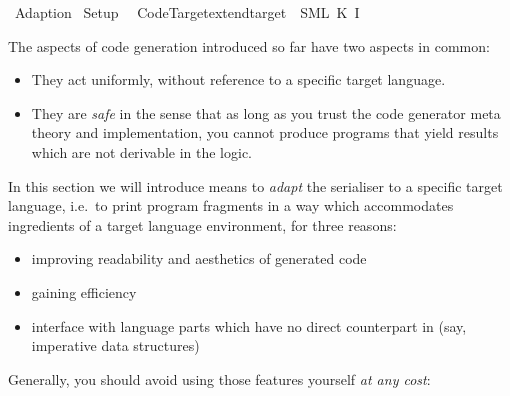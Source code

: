 %
\begin{isabellebody}%
\def\isabellecontext{Adaption}%
%
\isadelimtheory
%
\endisadelimtheory
%
\isatagtheory
{}\isamarkupfalse%
\ Adaption\isanewline
{}\ Setup\isanewline
{}%
\endisatagtheory
{\isafoldtheory}%
%
\isadelimtheory
\isanewline
%
\endisadelimtheory
%
\isadeliminvisible
\isanewline
%
\endisadeliminvisible
%
\isataginvisible
{}\isamarkupfalse%
\ {\isacharverbatimopen}\ Code{\isacharunderscore}Target{\isachardot}extend{\isacharunderscore}target\ {\isacharparenleft}{\isachardoublequote}{\isasymSML}{\isachardoublequote}{\isacharcomma}\ {\isacharparenleft}{\isachardoublequote}SML{\isachardoublequote}{\isacharcomma}\ K\ I{\isacharparenright}{\isacharparenright}\ {\isacharverbatimclose}%
\endisataginvisible
{\isafoldinvisible}%
%
\isadeliminvisible
%
\endisadeliminvisible
%
\isamarkuptrue%
%
\isamarkuptrue%
%
\begin{isamarkuptext}%
The aspects of code generation introduced so far have two aspects
  in common:

  \begin{itemize}
    \item They act uniformly, without reference to a specific
       target language.
    \item They are \emph{safe} in the sense that as long as you trust
       the code generator meta theory and implementation, you cannot
       produce programs that yield results which are not derivable
       in the logic.
  \end{itemize}

  \noindent In this section we will introduce means to \emph{adapt} the serialiser
  to a specific target language, i.e.~to print program fragments
  in a way which accommodates  ingredients of
  a target language environment, for three reasons:

  \begin{itemize}
    \item improving readability and aesthetics of generated code
    \item gaining efficiency
    \item interface with language parts which have no direct counterpart
      in  (say, imperative data structures)
  \end{itemize}

  \noindent Generally, you should avoid using those features yourself
  \emph{at any cost}:


\end{isamarkuptext}
\end{isabellebody}
